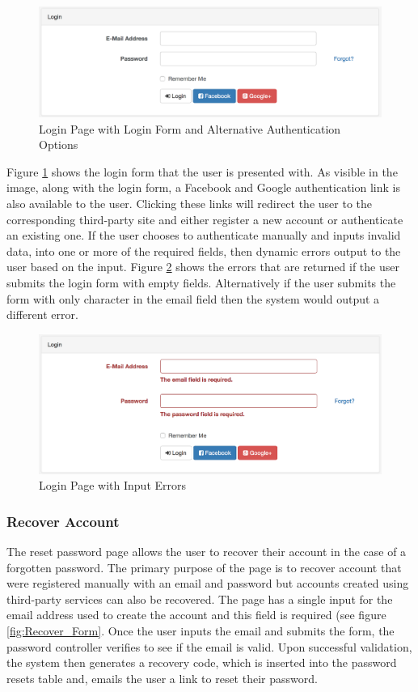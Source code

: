 \begin{figure}[H]
	\centering
	\includegraphics[width=1.0\textwidth]{images/Frisk/Login_Form}
	\caption{Login Page with Login Form and Alternative Authentication Options} \label{fig:Login_Form}
\end{figure}

Figure \ref{fig:Login_Form} shows the login form that the user is presented with. As visible in the image, along with the login form, a Facebook and Google authentication link is also available to the user. Clicking these links will redirect the user to the corresponding third-party site and either register a new account or authenticate an existing one. If the user chooses to authenticate manually and inputs invalid data, into one or more of the required fields, then dynamic errors output to the user based on the input. Figure \ref{fig:Login_Form_Errors} shows the errors that are returned if the user submits the login form with empty fields. Alternatively if the user submits the form with only character in the email field then the system would output a different error.

\begin{figure}[H]
	\centering
	\includegraphics[width=1.0\textwidth]{images/Frisk/Login_Form_Errors}
	\caption{Login Page with Input Errors} \label{fig:Login_Form_Errors}
\end{figure}

\subsubsection{Recover Account}
The reset password page allows the user to recover their account in the case of a forgotten password. The primary purpose of the page is to recover account that were registered manually with an email and password but accounts created using third-party services can also be recovered. The page has a single input for the email address used to create the account and this field is required (see figure \ref{fig:Recover_Form}. Once the user inputs the email and submits the form, the password controller verifies to see if the email is valid. Upon successful validation, the system then generates a recovery code, which is inserted into the password resets table and, emails the user a link to reset their password.

